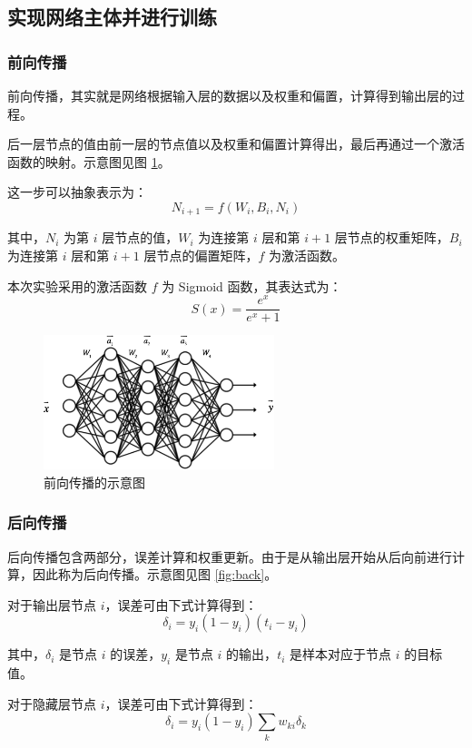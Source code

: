 \documentclass[a4paper, 12pt]{article}
\begin{document}
\subsection{实现网络主体并进行训练}

\subsubsection{前向传播}
前向传播，其实就是网络根据输入层的数据以及权重和偏置，计算得到输出层的过程。

后一层节点的值由前一层的节点值以及权重和偏置计算得出，最后再通过一个激活函数的映射。示意图见图 \ref{fig:forward}。

这一步可以抽象表示为：$$N_{i+1} = f(W_i,B_i,N_{i})$$

其中，$N_i$ 为第 $i$ 层节点的值，$W_i$ 为连接第 $i$ 层和第 $i+1$ 层节点的权重矩阵，$B_i$ 为连接第 $i$ 层和第 $i+1$ 层节点的偏置矩阵，$f$ 为激活函数。

本次实验采用的激活函数 $f$ 为 Sigmoid 函数，其表达式为：$$S(x) = \frac{e^x}{e^x+1}$$

\begin{figure}[htbp]
\centering
\includegraphics[width=0.6\textwidth]{images/forward.png}
\caption{前向传播的示意图}
\label{fig:forward}
\end{figure}

\subsubsection{后向传播}

后向传播包含两部分，误差计算和权重更新。由于是从输出层开始从后向前进行计算，因此称为后向传播。示意图见图 \ref{fig:back}。

对于输出层节点 $i$，误差可由下式计算得到：
$$\delta_i = y_i (1-y_i)(t_i-y_i)$$

其中，$\delta_i$ 是节点 $i$ 的误差，$y_i$ 是节点 $i$ 的输出，$t_i$ 是样本对应于节点 $i$ 的目标值。

对于隐藏层节点 $i$，误差可由下式计算得到：
$$\delta_i = y_i (1-y_i) \sum_k w_{ki}\delta_k$$
\end{document}
